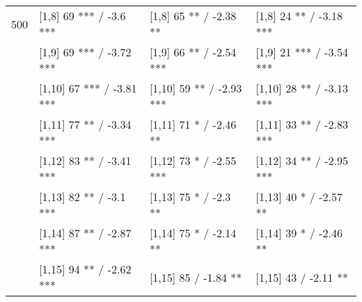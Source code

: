 \begin{table}
\begin{tabular}[t]{llll}
500 & {}[1,8] 69 *** / -3.6 *** & {}[1,8] 65 ** / -2.38 ** & {}[1,8] 24 ** / -3.18 ***\\
 & {}[1,9] 69 *** / -3.72 *** & {}[1,9] 66 ** / -2.54 *** & {}[1,9] 21 *** / -3.54 ***\\
 & {}[1,10] 67 *** / -3.81 *** & {}[1,10] 59 ** / -2.93 *** & {}[1,10] 28 ** / -3.13 ***\\
 & {}[1,11] 77 ** / -3.34 *** & {}[1,11] 71 * / -2.46 ** & {}[1,11] 33 ** / -2.83 ***\\
 & {}[1,12] 83 ** / -3.41 *** & {}[1,12] 73 * / -2.55 *** & {}[1,12] 34 ** / -2.95 ***\\
\addlinespace
 & {}[1,13] 82 ** / -3.1 *** & {}[1,13] 75 * / -2.3 ** & {}[1,13] 40 * / -2.57 **\\
 & {}[1,14] 87 ** / -2.87 *** & {}[1,14] 75 * / -2.14 ** & {}[1,14] 39 * / -2.46 **\\
 & {}[1,15] 94 ** / -2.62 *** & {}[1,15] 85  / -1.84 ** & {}[1,15] 43  / -2.11 **\\
\bottomrule
\end{tabular}
\end{table}

